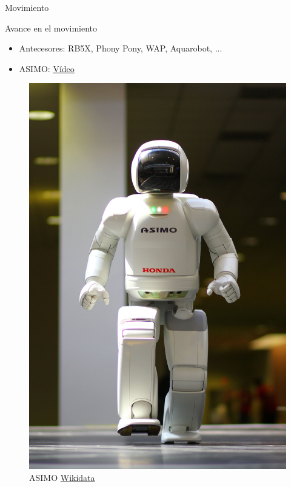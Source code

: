 \begin{frame}[fragile]{Movimiento}
\vspace{10px}
\pause
{}
\begin{block}{Avance en el movimiento}
	\begin{itemize}
		\item Antecesores: RB5X, Phony Pony, WAP, Aquarobot, ...
		\pause
		\item ASIMO: \href{https://www.youtube.com/watch?v=mI58DU1hu14}{Vídeo}
	\end{itemize}
\end{block}
\begin{figure}
	\centering
	\pause
	\includegraphics[scale=0.12]{./EtapaModerna/Imagenes/asimo.jpg}
	\caption{ASIMO \href{https://es.m.wikipedia.org/wiki/Archivo:ASIMO_4.28.11.jpg}{Wikidata}}
\end{figure}
\end{frame}

